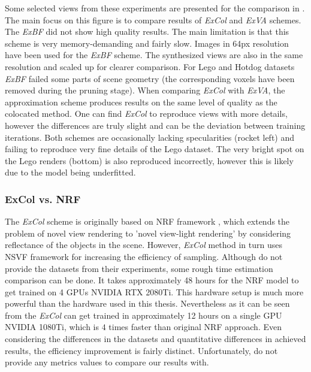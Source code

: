 Some selected views from these experiments are presented for the comparison in .
The main focus on this figure is to compare results of \textit{ExCol} and \textit{ExVA} schemes.
The \textit{ExBF} did not show high quality results.
The main limitation is that this scheme is very memory-demanding and fairly slow.
Images in 64px resolution have been used for the \textit{ExBF} scheme.
The synthesized views are also in the same resolution and scaled up for clearer comparison.
For Lego and Hotdog datasets \textit{ExBF} failed some parts of scene geometry 
(the corresponding voxels have been removed during the pruning stage).
When comparing \textit{ExCol} with \textit{ExVA},
the approximation scheme produces results on the same level of quality as the colocated method.
One can find \textit{ExCol} to reproduce views with more details,
however the differences are truly slight and can be the deviation between training iterations.
Both schemes are occasionally lacking specularities (rocket left)
and failing to reproduce very fine details of the Lego dataset.
The very bright spot on the Lego renders (bottom) is also reproduced incorrectly,
however this is likely due to the model being underfitted.



\subsubsection{ExCol vs. NRF}

The \textit{ExCol} scheme is originally based on NRF framework \cite{bi2020neural},
which extends the problem of novel view rendering to
'novel view-light rendering' by considering reflectance of the objects in the scene.
However, \textit{ExCol} method in turn uses NSVF framework for increasing the efficiency of sampling.
Although \cite{bi2020neural} do not provide the datasets from their experiments,
some rough time estimation comparison can be done.
It takes approximately 48 hours for the NRF model to get trained on 4 GPUs NVIDIA RTX 2080Ti.
This hardware setup is much more powerful than the hardware used in this thesis.
Nevertheless as it can be seen from 
the \textit{ExCol} can get trained in approximately 12 hours on a single GPU NVIDIA 1080Ti,
which is $4$ times faster than original NRF approach.
Even considering the differences in the datasets and quantitative differences in achieved results,
the efficiency improvement is fairly distinct.
Unfortunately, \cite{bi2020neural} do not provide any metrics values to compare our results with.




